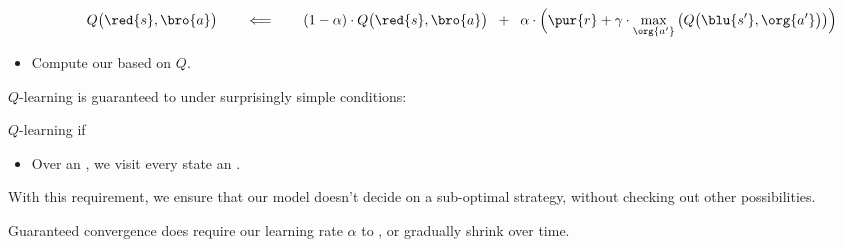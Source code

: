 \begin{definition}
\begin{itemize}
\begin{itemize}
                            \begin{equation*}
                                Q\big(\red{s},\bro{a} \big) 
                                \qquad\Longleftarrow\qquad
                                    (1-\alpha) \cdot Q\big(\red{s},\bro{a} \big)
                                    \;\;+\;\;
                                \alpha \cdot 
                                \Big( \pur{r}
                                    +
                                    \gamma \cdot
                                    \max_{\org{a'}} 
                                        \big( Q\big(\blu{s'},\org{a'} \big) \big) 
                                \Big)
                            \end{equation*}
                    \end{itemize}
                \item Compute our  based on $Q$.
            \end{itemize}
            
        \end{definition}



        $Q$-learning is guaranteed to  under surprisingly simple conditions:\\

        \begin{theorem}
            $Q$-learning  if 

            \begin{itemize}
                \item Over an , we visit every state an .
            \end{itemize}

            With this requirement, we ensure that our model doesn't decide on a sub-optimal strategy, without checking out other possibilities.
        \end{theorem}


        Guaranteed convergence does require our learning rate $\alpha$ to , or gradually shrink over time.

